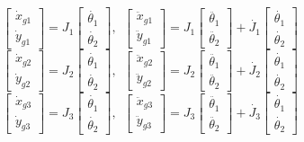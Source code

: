 \begin{equation*}
	\begin{bmatrix}
		\dot{x}_{g1} \\ \dot{y}_{g1}
	\end{bmatrix} = J_1 \begin{bmatrix}
	\dot{\theta_1} \\ \dot{\theta_2}
\end{bmatrix} , \ \ 
	\begin{bmatrix}
	\ddot{x}_{g1} \\ \ddot{y}_{g1}
\end{bmatrix} = J_1 \begin{bmatrix}
	\ddot{\theta_1} \\ \ddot{\theta_2}
\end{bmatrix} + \dot{J_1} \begin{bmatrix}
\dot{\theta_1} \\ \dot{\theta_2}
\end{bmatrix}
\end{equation*}
\begin{equation*}
	\begin{bmatrix}
		\dot{x}_{g2} \\ \dot{y}_{g2}
	\end{bmatrix} = J_2 \begin{bmatrix}
		\dot{\theta_1} \\ \dot{\theta_2}
	\end{bmatrix} , \ \ 
	\begin{bmatrix}
		\ddot{x}_{g2} \\ \ddot{y}_{g2}
	\end{bmatrix} = J_2 \begin{bmatrix}
		\ddot{\theta_1} \\ \ddot{\theta_2}
	\end{bmatrix} + \dot{J_2} \begin{bmatrix}
		\dot{\theta_1} \\ \dot{\theta_2}
	\end{bmatrix}
\end{equation*}
\begin{equation*}
	\begin{bmatrix}
		\dot{x}_{g3} \\ \dot{y}_{g3}
	\end{bmatrix} = J_3 \begin{bmatrix}
		\dot{\theta_1} \\ \dot{\theta_2}
	\end{bmatrix} , \ \ 
	\begin{bmatrix}
		\ddot{x}_{g3} \\ \ddot{y}_{g3}
	\end{bmatrix} = J_3 \begin{bmatrix}
		\ddot{\theta_1} \\ \ddot{\theta_2}
	\end{bmatrix} + \dot{J_3} \begin{bmatrix}
		\dot{\theta_1} \\ \dot{\theta_2}
	\end{bmatrix}
\end{equation*}
